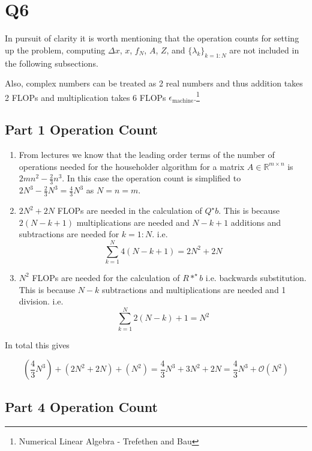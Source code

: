\documentclass{article}
\newcommand{\RR}{\mathbb{R}}
\begin{document}
\newpage
\section{Q6}

In pursuit of clarity it is worth mentioning that the operation counts for setting up the problem, computing $\Delta x$, $x$, $f_N$, $A$, $Z$, and $\{ \lambda_k \}_{k=1:N}$ are not included in the following subsections.

Also, complex numbers can be treated as 2 real numbers and thus addition takes 2 FLOPs and multiplication takes 6 FLOPs $\epsilon_{\text{machine}}$.\footnote{Numerical Linear Algebra - Trefethen and Bau}
\subsection{Part 1 Operation Count}

\begin{enumerate}
	\item From lectures we know that the leading order terms of the number of operations needed for the householder algorithm for a matrix $A \in \RR^{m \times n}$ is $2 m n^2 - \frac{2}{3}n^3$. In this case the operation count is simplified to $2 N^3 - \frac{2}{3}N^3 = \frac{4}{3}N^3$ as $N = n = m$.
	\item $2N^2 + 2N$ FLOPs are needed in the calculation of $Q^\star b$. This is because $2(N - k + 1)$ multiplications are needed and $N - k + 1$ additions and subtractions are needed for $k = 1:N$. i.e. $$ \sum^{N}_{k=1} 4(N - k + 1) = 2N^2 + 2N $$ 
	\item $N^2$ FLOPs are needed for the calculation of $R*^\star b$ i.e. backwards substitution. This is because $N-k$ subtractions and multiplications are needed and 1 division. i.e. $$ \sum_{k=1}^N 2(N-k) + 1 = N^2 $$
\end{enumerate}

In total this gives 

\[
	(\frac{4}{3}N^3) + (2N^2 + 2N) + (N^2) = \frac{4}{3}N^3 + 3N^2 + 2N = \frac{4}{3}N^3 + \mathcal{O}(N^2)
\]

\subsection{Part 4 Operation Count}
\end{document}
